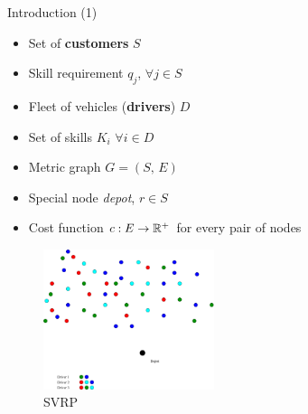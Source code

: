 \begin{frame}[t]{Introduction (1)}
    \begin{minipage}[t]{0.48\textwidth}
        \begin{itemize}
            \item<1-> Set of \textbf{customers} $S$
            \item<2-> Skill requirement $q_j$,  $\forall j \in S$
            \item<3-> Fleet of vehicles (\textbf{drivers}) $D$
            \item<4-> Set of skills $K_i$ $\forall i \in D$
            \item<5-> Metric graph $G = (S, \, E)$
            \item<6-> Special node \emph{depot}, $r \in S$
            \item<7-> Cost function $c:E \rightarrow \mathbb{R}^+$ for every pair of nodes
        \end{itemize}
    \end{minipage}
    \begin{minipage}[t]{0.48\textwidth}
        \begin{figure}
            \centering
            \includegraphics[width=5cm]{VRPSS01.pdf}
            \caption{SVRP}
            \label{fig:VRPSS01}
        \end{figure}            
    \end{minipage}
\end{frame}

